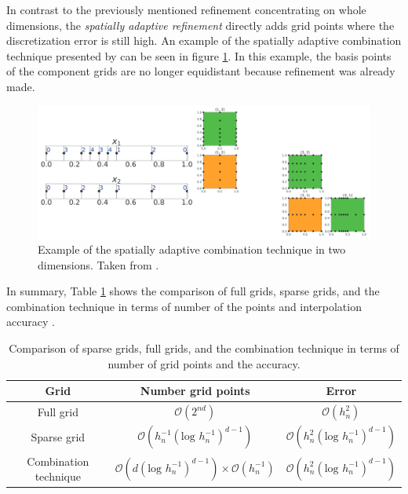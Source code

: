 In contrast to the previously mentioned refinement concentrating on whole dimensions, the \textit{spatially adaptive refinement} directly adds grid points where the discretization error is still high. An example of the spatially adaptive combination technique presented by \cite{obersteiner2021generalized} can be seen in figure \ref{fig:spatially_adaptive_combi_technique}. In this example, the basis points of the component grids are no longer equidistant because refinement was already made. \newline 

\begin{figure}[H]
	\centering
	\includegraphics[scale=0.2]{figures/spatially_adaptive_combi_technique.png}
	\caption{ Example of the spatially adaptive combination technique in two dimensions. Taken from \cite{obersteiner2021generalized}. }
	\label{fig:spatially_adaptive_combi_technique}
\end{figure}


In summary, Table \ref{tab:comparison_grids} shows the comparison of full grids, sparse grids, and the combination technique in terms of number of the points and interpolation accuracy \cite{pfluger2010spatially}.


\begin{table}[H]
	\caption{ Comparison of sparse grids, full grids, and the combination technique in terms of number of grid points and the accuracy. }
	\label{tab:comparison_grids}
	\centering
	\begin{tabular}{|c c c|} 
		\hline
		Grid & Number grid points & Error \\
		\hline
		Full grid & $ \mathcal{O}\left(2^{nd}\right) $ & $ \mathcal{O}\left(h_n^2\right) $  \\
		Sparse grid & $ \mathcal{O}\left(h_n^{-1}\left(\text{log } h_n^{-1}\right)^{d-1}\right) $ & $ \mathcal{O}\left(h_n^{2}\left(\text{log } h_n^{-1}\right)^{d-1}\right) $ \\
		Combination technique & $ \mathcal{O}\left(d\left(\text{log } h_n^{-1}\right)^{d-1}\right) \times  \mathcal{O}\left(h_n^{-1}\right) $ & $ \mathcal{O}\left(h_n^{2}\left(\text{log } h_n^{-1}\right)^{d-1}\right) $\\
		\hline
	\end{tabular}
\end{table}

